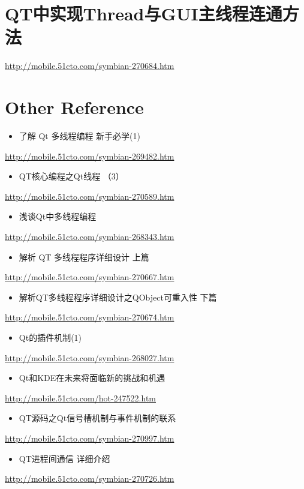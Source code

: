 \documentclass[9pt,b5paper]{article}
\begin{document}
\section{QT中实现Thread与GUI主线程连通方法}
\label{sec-9}
\url{http://mobile.51cto.com/symbian-270684.htm}

\section{Other Reference}
\label{sec-10}
\begin{itemize}
\item 了解 Qt 多线程编程 新手必学(1)
\end{itemize}
\url{http://mobile.51cto.com/symbian-269482.htm}
\begin{itemize}
\item QT核心编程之Qt线程 （3）
\end{itemize}
\url{http://mobile.51cto.com/symbian-270589.htm}
\begin{itemize}
\item 浅谈Qt中多线程编程
\end{itemize}
\url{http://mobile.51cto.com/symbian-268343.htm}
\begin{itemize}
\item 解析 QT 多线程程序详细设计 上篇
\end{itemize}
\url{http://mobile.51cto.com/symbian-270667.htm}
\begin{itemize}
\item 解析QT多线程程序详细设计之QObject可重入性 下篇
\end{itemize}
\url{http://mobile.51cto.com/symbian-270674.htm}
\begin{itemize}
\item Qt的插件机制(1)
\end{itemize}
\url{http://mobile.51cto.com/symbian-268027.htm}
\begin{itemize}
\item Qt和KDE在未来将面临新的挑战和机遇
\end{itemize}
\url{http://mobile.51cto.com/hot-247522.htm}
\begin{itemize}
\item QT源码之Qt信号槽机制与事件机制的联系
\end{itemize}
\url{http://mobile.51cto.com/symbian-270997.htm}
\begin{itemize}
\item QT进程间通信 详细介绍
\end{itemize}
\url{http://mobile.51cto.com/symbian-270726.htm}
\end{document}
